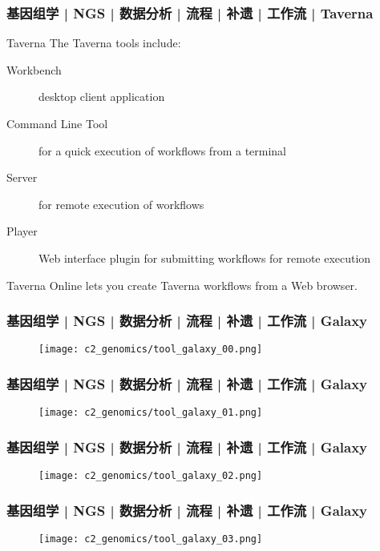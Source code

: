 \begin{frame}
  \frametitle{基因组学 | NGS | 数据分析 | 流程 | 补遗 | 工作流 | Taverna}
  \begin{block}{Taverna}
    The Taverna tools include:
    \begin{description}
      \item[Workbench] desktop client application
      \item[Command Line Tool] for a quick execution of workflows from a terminal
      \item[Server] for remote execution of workflows
      \item[Player] Web interface plugin for submitting workflows for remote execution
    \end{description}
    Taverna Online lets you create Taverna workflows from a Web browser.
  \end{block}
\end{frame}

\begin{frame}
  \frametitle{基因组学 | NGS | 数据分析 | 流程 | 补遗 | 工作流 | Galaxy}
  \begin{figure}
    \centering
    \texttt{[image: c2\_genomics/tool\_galaxy\_00.png]}
  \end{figure}
\end{frame}

\begin{frame}
  \frametitle{基因组学 | NGS | 数据分析 | 流程 | 补遗 | 工作流 | Galaxy}
  \begin{figure}
    \centering
    \texttt{[image: c2\_genomics/tool\_galaxy\_01.png]}
  \end{figure}
\end{frame}

\begin{frame}
  \frametitle{基因组学 | NGS | 数据分析 | 流程 | 补遗 | 工作流 | Galaxy}
  \begin{figure}
    \centering
    \texttt{[image: c2\_genomics/tool\_galaxy\_02.png]}
  \end{figure}
\end{frame}

\begin{frame}
  \frametitle{基因组学 | NGS | 数据分析 | 流程 | 补遗 | 工作流 | Galaxy}
  \begin{figure}
    \centering
    \texttt{[image: c2\_genomics/tool\_galaxy\_03.png]}
  \end{figure}
\end{frame}

